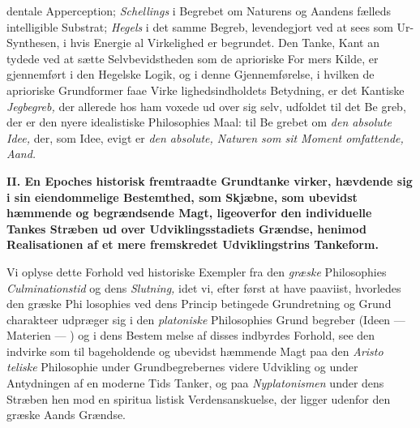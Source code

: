 dentale Apperception; \emph{Schellings} i Begrebet om Naturens
og Aandens fælleds intelligible Substrat; \emph{Hegels} i det samme
Begreb, levendegjort ved at sees som Ur-Synthesen, i hvis
Energie al Virkelighed er begrundet. Den Tanke, Kant an\-%
tydede ved at sætte Selvbevidstheden som de aprioriske For\-%
mers Kilde, er gjennemført i den Hegelske Logik, og i denne
Gjennemførelse, i hvilken de aprioriske Grundformer faae Virke\-%
lighedsindholdets Betydning, er det Kantiske \emph{Jegbegreb,} der
allerede hos ham voxede ud over sig selv, udfoldet til det Be\-%
greb, der er den nyere idealistiske Philosophies Maal: til Be\-%
grebet om \emph{den absolute Idee,} der, som Idee, evigt er \emph{den
absolute, Naturen som sit Moment omfattende, Aand.}

\divrule

\begin{center}
\textbf{\large II. En Epoches historisk fremtraadte Grundtanke virker,
hævdende sig i sin eiendommelige Bestemthed, som Skjæbne, som ubevidst
hæmmende og begrændsende Magt, ligeoverfor den individuelle Tankes Stræben ud
over Udviklingsstadiets Grændse, henimod Realisationen af et mere fremskredet
Udviklingstrins Tankeform.}
\end{center}

Vi oplyse dette Forhold ved historiske Exempler fra den
\emph{græske} Philosophies \emph{Culminationstid} og dens \emph{Slutning,}
idet vi, efter først at have paaviist, hvorledes den græske Phi\-%
losophies ved dens Princip betingede Grundretning og Grund\-%
charakteer udpræger sig i den \emph{platoniske} Philosophies Grund\-%
begreber (Ideen --- Materien --- ) og i dens Bestem\-%
melse af disses indbyrdes Forhold, see den indvirke som til\-%
bageholdende og ubevidst hæmmende Magt paa den \emph{Aristo\-%
teliske} Philosophie under Grundbegrebernes videre Udvikling
og under Antydningen af en moderne Tids Tanker, og paa
\emph{Nyplatonismen} under dens Stræben hen mod en spiritua\-%
listisk Verdensanskuelse, der ligger udenfor den græske Aands
Grændse.

